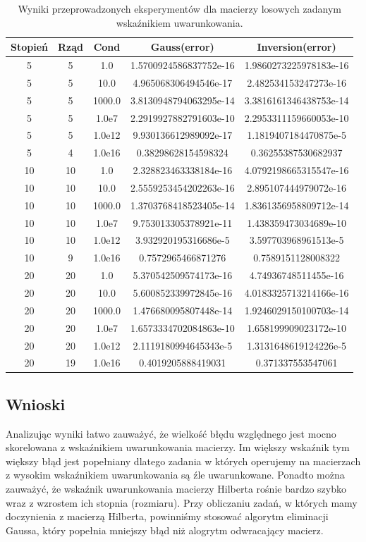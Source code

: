 \documentclass[]{article}
\begin{document}
\begin{table}[h]
	\centering
	\begin{tabular}{||c c c c c||} 
		\hline
		Stopień & Rząd & Cond & Gauss(error) & Inversion(error) \\ [0.5ex] 
		\hline\hline
		5 & 5 & 1.0 & 1.5700924586837752e-16 & 1.9860273225978183e-16 \\
		5 & 5 & 10.0 & 4.965068306494546e-17 & 2.482534153247273e-16 \\
		5 & 5 & 1000.0 & 3.8130948794063295e-14 & 3.3816161346438753e-14 \\
		5 & 5 & 1.0e7 & 2.2919927882791603e-10 & 2.2953311159660053e-10 \\
		5 & 5 & 1.0e12 & 9.930136612989092e-17 & 1.1819407184470875e-5 \\
		5 & 4 & 1.0e16 & 0.38298628154598324 & 0.36255387530682937 \\
		10 & 10 & 1.0 & 2.328823463338184e-16 & 4.0792198665315547e-16 \\
		10 & 10 & 10.0 & 2.5559253454202263e-16 & 2.895107444979072e-16 \\
		10 & 10 & 1000.0 & 1.3703768418523405e-14 & 1.8361356958809712e-14 \\
		10 & 10 & 1.0e7 & 9.753013305378921e-11 & 1.438359473034689e-10 \\
		10 & 10 & 1.0e12 & 3.932920195316686e-5 & 3.597703968961513e-5 \\
		10 & 9 & 1.0e16 & 0.7572965466871276 & 0.7589151128008322 \\
		20 & 20 & 1.0 & 5.370542509574173e-16 & 4.74936748511455e-16 \\
		20 & 20 & 10.0 & 5.600852339972845e-16 & 4.0183325713214166e-16 \\
		20 & 20 & 1000.0 & 1.476680095807448e-14 & 1.9246029150100703e-14 \\
		20 & 20 & 1.0e7 & 1.6573334702084863e-10 & 1.658199909023172e-10 \\
		20 & 20 & 1.0e12 & 2.1119180994645343e-5 & 1.3131648619124226e-5 \\
		20 & 19 & 1.0e16 & 0.4019205888419031 & 0.371337553547061 \\
		\hline
	\end{tabular}
	\caption{Wyniki przeprowadzonych eksperymentów dla macierzy losowych zadanym wskaźnikiem uwarunkowania.}
\end{table}
\subsection{Wnioski}
Analizując wyniki łatwo zauważyć, że wielkość błędu względnego jest mocno skorelowana z wskaźnikiem uwarunkowania macierzy. Im większy wskaźnik tym większy błąd jest popełniany dlatego zadania w których operujemy na macierzach z wysokim wskaźnikiem uwarunkowania są źle uwarunkowane. Ponadto można zauważyć, że wskaźnik uwarunkowania macierzy Hilberta rośnie bardzo szybko wraz z wzrostem ich stopnia (rozmiaru). Przy obliczaniu zadań, w których mamy doczynienia z macierzą Hilberta, powinniśmy stosować algorytm eliminacji Gaussa, który popełnia mniejszy błąd niż alogrytm odwracający macierz.
\end{document}
